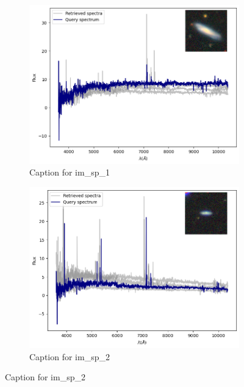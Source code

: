 \documentclass[a4paper,12pt]{article}
\begin{document}
\begin{figure}[H]
    \begin{subfigure}[b]{0.45\textwidth}
        \centering
        \includegraphics[width=\textwidth]{../figures/spectral_retrieval_im_sp_1}
        \caption{Caption for im\_sp\_1}
        \label{fig:im_sp_1}
    \end{subfigure}%
    \hfill
    \begin{subfigure}[b]{0.45\textwidth}
        \centering
        \includegraphics[width=\textwidth]{../figures/spectral_retrieval_im_sp_2}
        \caption{Caption for im\_sp\_2}
        \label{fig:im_sp_2}
    \end{subfigure}


\end{figure}
\end{document}
